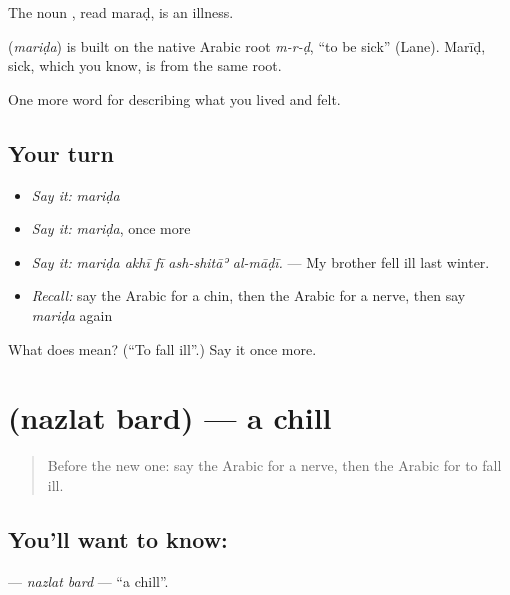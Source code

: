The noun , read maraḍ, is an illness.

\begin{cousinweb}
\textbf{} (\emph{mariḍa}) is built on the native Arabic root \emph{m-r-ḍ}, \textquotedblleft{}to be sick\textquotedblright{} (Lane). Marīḍ, sick, which you know, is from the same root.
\end{cousinweb}

\begin{grammarlens}[title={What you've built}]
One more word for describing what you lived and felt.
\end{grammarlens}

\subsection*{Your turn}
\begin{itemize}
\raggedright
  \item \emph{Say it:} \emph{mariḍa}
  \item \emph{Say it:} \emph{mariḍa}, once more
  \item \emph{Say it:} \emph{mariḍa akhī fī ash-shitāʾ al-māḍī.} — My brother fell ill last winter.
  \item \emph{Recall:} say the Arabic for a chin, then the Arabic for a nerve, then say \emph{mariḍa} again
\end{itemize}

\begin{tcolorbox}[breakable,colback=teal!4,colframe=teal!35!black,title={Before you move on}]
What does  mean? (\textquotedblleft{}To fall ill\textquotedblright{}.) Say it once more.
\end{tcolorbox}
\section[\texorpdfstring{\ar{نزلة} \ar{برد} (nazlat bard)}{نزلة برد (nazlat bard)}]{  (nazlat bard) — a chill}

\label{lesson:AR-C507-nazlat-bard}



\begin{quote}
Before the new one: say the Arabic for a nerve, then the Arabic for to fall ill.
\end{quote}

\subsection*{You'll want to know:  }
\textbf{ } — \emph{nazlat bard} — \textquotedblleft{}a chill\textquotedblright{}.

